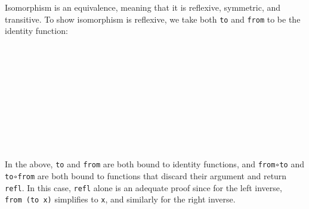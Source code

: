 Isomorphism is an equivalence, meaning that it is reflexive, symmetric,
and transitive. To show isomorphism is reflexive, we take both
\texttt{to} and \texttt{from} to be the identity function:

\begin{fence}
\begin{code}%
\>[0]\AgdaSpace{}%
\AgdaSymbol{:}\AgdaSpace{}%
\AgdaSpace{}%
\AgdaSymbol{\{}\AgdaSpace{}%
\AgdaSymbol{:}\AgdaSpace{}%
\AgdaSymbol{\}}\<%
\\
\>[0][@{}l@{\AgdaIndent{0}}]%
\>[4]\AgdaComment{-----}\<%
\\
\>[0][@{}l@{\AgdaIndent{0}}]%
\>[2]\AgdaSpace{}%
\AgdaSpace{}%
\AgdaSpace{}%
\<%
\\
\>[0]\AgdaSpace{}%
\AgdaSymbol{=}\<%
\\
\>[0][@{}l@{\AgdaIndent{0}}]%
\>[2]\<%
\\
\>[2][@{}l@{\AgdaIndent{0}}]%
\>[4]\AgdaSymbol{\{}\AgdaSpace{}%
%
\>[14]\AgdaSymbol{=}\AgdaSpace{}%
\AgdaSpace{}%
\AgdaSpace{}%
\AgdaSymbol{\}}\<%
\\
%
\>[4]\AgdaSymbol{;}\AgdaSpace{}%
%
\>[14]\AgdaSymbol{=}\AgdaSpace{}%
\AgdaSpace{}%
\AgdaSpace{}%
\AgdaSymbol{\}}\<%
\\
%
\>[4]\AgdaSymbol{;}\AgdaSpace{}%
\AgdaSpace{}%
\AgdaSymbol{=}\AgdaSpace{}%
\AgdaSpace{}%
\AgdaSpace{}%
\AgdaSymbol{\}}\<%
\\
%
\>[4]\AgdaSymbol{;}\AgdaSpace{}%
\AgdaSpace{}%
\AgdaSymbol{=}\AgdaSpace{}%
\AgdaSpace{}%
\AgdaSpace{}%
\AgdaSymbol{\}}\<%
\\
%
\>[4]\AgdaSymbol{\}}\<%
\end{code}
\end{fence}

In the above, \texttt{to} and \texttt{from} are both bound to identity
functions, and \texttt{from∘to} and \texttt{to∘from} are both bound to
functions that discard their argument and return \texttt{refl}. In this
case, \texttt{refl} alone is an adequate proof since for the left
inverse, \texttt{from\ (to\ x)} simplifies to \texttt{x}, and similarly
for the right inverse.

